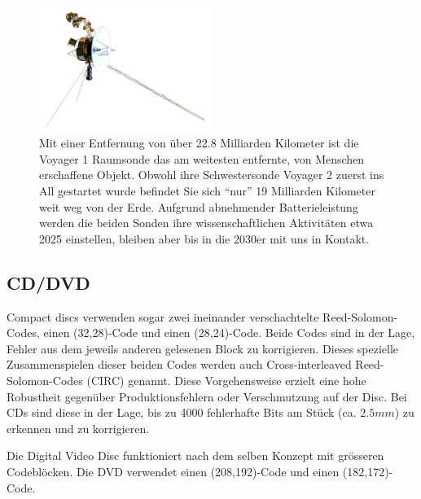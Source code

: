 \begin{figure}
	\centering
	\includegraphics[width=0.5\textwidth]{papers/reedsolomon/images/Voyager_Sonde}
	\caption{Mit einer Entfernung von über 22.8 Milliarden Kilometer ist die Voyager 1 Raumsonde das am weitesten entfernte, von Menschen erschaffene Objekt. Obwohl ihre Schwestersonde Voyager 2 zuerst ins All gestartet wurde befindet Sie sich ``nur'' 19 Milliarden Kilometer weit weg von der Erde. Aufgrund abnehmender Batterieleistung werden die beiden Sonden ihre wissenschaftlichen Aktivitäten etwa 2025 einstellen, bleiben aber bis in die 2030er mit uns in Kontakt.}
	\label{fig:voyager}
\end{figure}

\subsection{CD/DVD}
Compact discs verwenden sogar zwei ineinander verschachtelte Reed-Solomon-Codes, einen (32,28)-Code und einen (28,24)-Code.
Beide Codes sind in der Lage, Fehler aus dem jeweils anderen gelesenen Block zu korrigieren. Dieses spezielle Zusammenspielen dieser beiden Codes werden auch Cross-interleaved Reed-Solomon-Codes (CIRC) genannt.
Diese Vorgehensweise erzielt eine hohe Robustheit gegenüber Produktionsfehlern oder Verschmutzung auf der Disc. Bei CDs sind diese in der Lage, bis zu 4000 fehlerhafte Bits am Stück (ca. $2.5mm$) zu erkennen und zu korrigieren. 

Die Digital Video Disc funktioniert nach dem selben Konzept mit grösseren Codeblöcken. Die DVD verwendet einen (208,192)-Code und einen (182,172)-Code.


